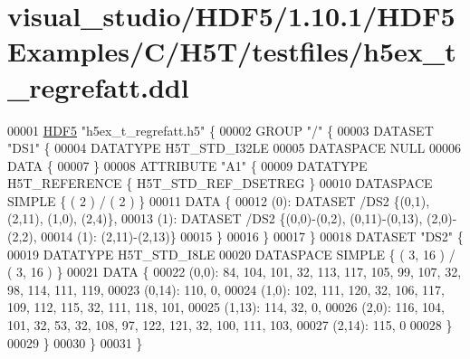 \hypertarget{visual__studio_2_h_d_f5_21_810_81_2_h_d_f5_examples_2_c_2_h5_t_2testfiles_2h5ex__t__regrefatt_8ddl_source}{}\section{visual\+\_\+studio/\+H\+D\+F5/1.10.1/\+H\+D\+F5\+Examples/\+C/\+H5\+T/testfiles/h5ex\+\_\+t\+\_\+regrefatt.ddl}
\label{visual__studio_2_h_d_f5_21_810_81_2_h_d_f5_examples_2_c_2_h5_t_2testfiles_2h5ex__t__regrefatt_8ddl_source}

\begin{DoxyCode}
00001 \hyperlink{namespace_h_d_f5}{HDF5} \textcolor{stringliteral}{"h5ex\_t\_regrefatt.h5"} \{
00002 GROUP \textcolor{stringliteral}{"/"} \{
00003    DATASET \textcolor{stringliteral}{"DS1"} \{
00004       DATATYPE  H5T\_STD\_I32LE
00005       DATASPACE  NULL
00006       DATA \{
00007       \}
00008       ATTRIBUTE \textcolor{stringliteral}{"A1"} \{
00009          DATATYPE  H5T\_REFERENCE \{ H5T\_STD\_REF\_DSETREG \}
00010          DATASPACE  SIMPLE \{ ( 2 ) / ( 2 ) \}
00011          DATA \{
00012          (0): DATASET /DS2 \{(0,1), (2,11), (1,0), (2,4)\},
00013          (1): DATASET /DS2 \{(0,0)-(0,2), (0,11)-(0,13), (2,0)-(2,2),
00014          (1):  (2,11)-(2,13)\}
00015          \}
00016       \}
00017    \}
00018    DATASET \textcolor{stringliteral}{"DS2"} \{
00019       DATATYPE  H5T\_STD\_I8LE
00020       DATASPACE  SIMPLE \{ ( 3, 16 ) / ( 3, 16 ) \}
00021       DATA \{
00022       (0,0): 84, 104, 101, 32, 113, 117, 105, 99, 107, 32, 98, 114, 111, 119,
00023       (0,14): 110, 0,
00024       (1,0): 102, 111, 120, 32, 106, 117, 109, 112, 115, 32, 111, 118, 101,
00025       (1,13): 114, 32, 0,
00026       (2,0): 116, 104, 101, 32, 53, 32, 108, 97, 122, 121, 32, 100, 111, 103,
00027       (2,14): 115, 0
00028       \}
00029    \}
00030 \}
00031 \}
\end{DoxyCode}
